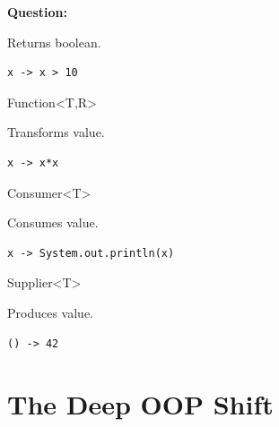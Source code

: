 \documentclass[11pt,a4paper]{book}
\begin{document}

\textbf{Question:}


Returns boolean.


\begin{verbatim} 
x -> x > 10
\end{verbatim}


Function<T,R>


Transforms value.


\begin{verbatim} 
x -> x*x
\end{verbatim}


Consumer<T>


Consumes value.


\begin{verbatim} 
x -> System.out.println(x)
\end{verbatim}


Supplier<T>


Produces value.


\begin{verbatim} 
() -> 42
\end{verbatim}


\section{The Deep OOP Shift}
\end{document}
